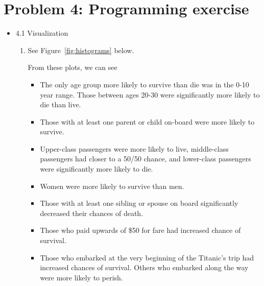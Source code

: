 \documentclass[11pt]{article}
\begin{document}
\newpage
\section{Problem 4: Programming exercise}
\begin{itemize}
  \item 4.1 Visualization
  \begin{enumerate}
    \item See Figure~\ref{fig:histograms} below.

      From these plots, we can see
      \begin{itemize}
        \item The only age group more likely to survive than die was in the 0-10
          year range. Those between ages 20-30 were significantly more likely to
          die than live.
        \item Those with at least one parent or child on-board were more likely
          to survive.
        \item Upper-class passengers were more likely to live, middle-class
          passengers had closer to a 50/50 chance, and lower-class passengers
          were significantly more likely to die.
        \item Women were more likely to survive than men.
        \item Those with at least one sibling or spouse on board significantly
          decreased their chances of death.
        \item Those who paid upwards of \$50 for fare had increased chance of
          survival.
        \item Those who embarked at the very beginning of the Titanic's trip had
          increased chances of survival. Others who embarked along the way were
          more likely to perish.
      \end{itemize}
      \begin{figure}
        \centering
        \begin{subfigure}[b]{0.49\textwidth}

\end{subfigure}
\end{figure}
\end{enumerate}
\end{itemize}
\end{document}
